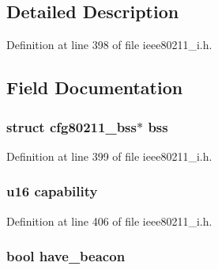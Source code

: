 \subsection{Detailed Description}


Definition at line 398 of file ieee80211\-\_\-i.\-h.



\subsection{Field Documentation}
\hypertarget{structieee80211__mgd__assoc__data_aa8d95d64d2cb5a56a0fd985733e99b06}{
\subsubsection[{bss}]{\setlength{\rightskip}{0pt plus 5cm}struct cfg80211\-\_\-bss$\ast$ bss}}\label{structieee80211__mgd__assoc__data_aa8d95d64d2cb5a56a0fd985733e99b06}


Definition at line 399 of file ieee80211\-\_\-i.\-h.

\hypertarget{structieee80211__mgd__assoc__data_ac74162c5a27aacb803f0860ac5da7d89}{
\subsubsection[{capability}]{\setlength{\rightskip}{0pt plus 5cm}u16 capability}}\label{structieee80211__mgd__assoc__data_ac74162c5a27aacb803f0860ac5da7d89}


Definition at line 406 of file ieee80211\-\_\-i.\-h.

\hypertarget{structieee80211__mgd__assoc__data_a9d76baa171cb69d351febe377f89a6ba}{
\subsubsection[{have\-\_\-beacon}]{\setlength{\rightskip}{0pt plus 5cm}bool have\-\_\-beacon}}\label{structieee80211__mgd__assoc__data_a9d76baa171cb69d351febe377f89a6ba}



